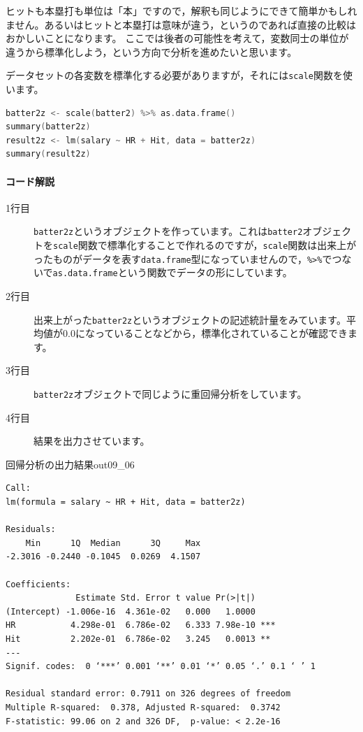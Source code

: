 \documentclass{ltjsbook}
\begin{document}
ヒットも本塁打も単位は「本」ですので，解釈も同じようにできて簡単かもしれません。あるいはヒットと本塁打は意味が違う，というのであれば直接の比較はおかしいことになります。
ここでは後者の可能性を考えて，変数同士の単位が違うから標準化しよう，という方向で分析を進めたいと思います。

データセットの各変数を標準化する必要がありますが，それには\texttt{scale}関数を使います。

\begin{lstlisting}[language=c++,label={code:09_09},caption={標準化したデータで重回帰分析を実行}]
batter2z <- scale(batter2) %>% as.data.frame()
summary(batter2z)
result2z <- lm(salary ~ HR + Hit, data = batter2z)
summary(result2z)
\end{lstlisting}


\paragraph{コード解説}
\begin{description}
	\item[1行目]\texttt{batter2z}というオブジェクトを作っています。これは\texttt{batter2}オブジェクトを\verb|scale|関数で標準化することで作れるのですが，\verb|scale|関数は出来上がったものがデータを表す\texttt{data.frame}型になっていませんので，\verb|%>%|でつないで\verb|as.data.frame|という関数でデータの形にしています。
	\item[2行目] 出来上がった\texttt{batter2z}というオブジェクトの記述統計量をみています。平均値が0.0になっていることなどから，標準化されていることが確認できます。
	\item[3行目]  \texttt{batter2z}オブジェクトで同じように重回帰分析をしています。
	\item[4行目] 結果を出力させています。
\end{description}

\begin{Rscreen}{回帰分析の出力結果}{out09_06}
	\begin{verbatim}
Call:
lm(formula = salary ~ HR + Hit, data = batter2z)

Residuals:
    Min      1Q  Median      3Q     Max 
-2.3016 -0.2440 -0.1045  0.0269  4.1507 

Coefficients:
              Estimate Std. Error t value Pr(>|t|)    
(Intercept) -1.006e-16  4.361e-02   0.000   1.0000    
HR           4.298e-01  6.786e-02   6.333 7.98e-10 ***
Hit          2.202e-01  6.786e-02   3.245   0.0013 ** 
---
Signif. codes:  0 ‘***’ 0.001 ‘**’ 0.01 ‘*’ 0.05 ‘.’ 0.1 ‘ ’ 1

Residual standard error: 0.7911 on 326 degrees of freedom
Multiple R-squared:  0.378,	Adjusted R-squared:  0.3742 
F-statistic: 99.06 on 2 and 326 DF,  p-value: < 2.2e-16
\end{verbatim}
\end{Rscreen}
\end{document}
